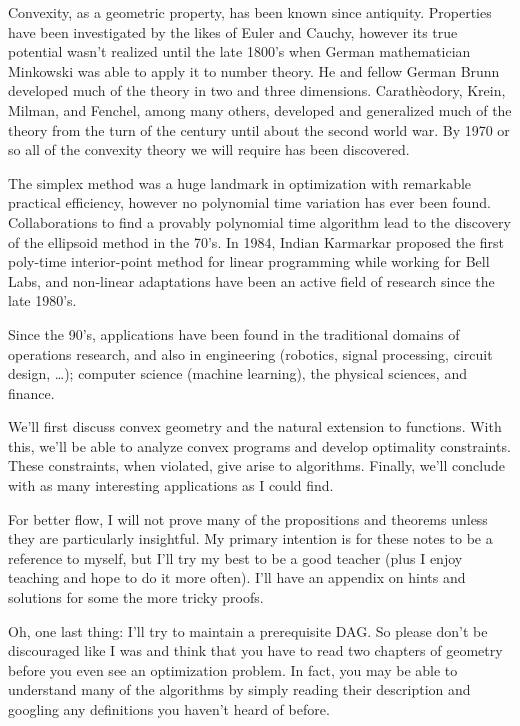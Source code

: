\documentclass[11pt]{article}
\numberwithin{equation}{section}
\theoremstyle{definition}
\begin{document}
Convexity, as a geometric property, has been known since antiquity. Properties have been investigated by the likes of Euler and Cauchy, however its true potential wasn't realized until the late 1800's when German mathematician Minkowski was able to apply it to number theory. He and fellow German Brunn developed much of the theory in two and three dimensions. Carath\`eodory, Krein, Milman, and Fenchel, among many others, developed and generalized much of the theory from the turn of the century until about the second world war. By 1970 or so all of the convexity theory we will require has been discovered.

The simplex method was a huge landmark in optimization with remarkable practical efficiency, however no polynomial time variation has ever been found. Collaborations to find a provably polynomial time algorithm lead to the discovery of the ellipsoid method in the 70's. In 1984, Indian Karmarkar proposed the first poly-time interior-point method for linear programming while working for Bell Labs, and non-linear adaptations have been an active field of research since the late 1980's.

Since the 90's, applications have been found in the traditional domains of operations research, and also in engineering (robotics, signal processing, circuit design, \dots); computer science (machine learning), the physical sciences, and finance.

We'll first discuss convex geometry and the natural extension to functions. With this, we'll be able to analyze convex programs and develop optimality constraints. These constraints, when violated, give arise to algorithms. Finally, we'll conclude with as many interesting applications as I could find.

For better flow, I will not prove many of the propositions and theorems unless they are particularly insightful. My primary intention is for these notes to be a reference to myself, but I'll try my best to be a good teacher (plus I enjoy teaching and hope to do it more often). I'll have an appendix on hints and solutions for some the more tricky proofs.

Oh, one last thing: I'll try to maintain a prerequisite DAG. So please don't be discouraged like I was and think that you have to read two chapters of geometry before you even see an optimization problem. In fact, you may be able to understand many of the algorithms by simply reading their description and googling any definitions you haven't heard of before.
\end{document}
